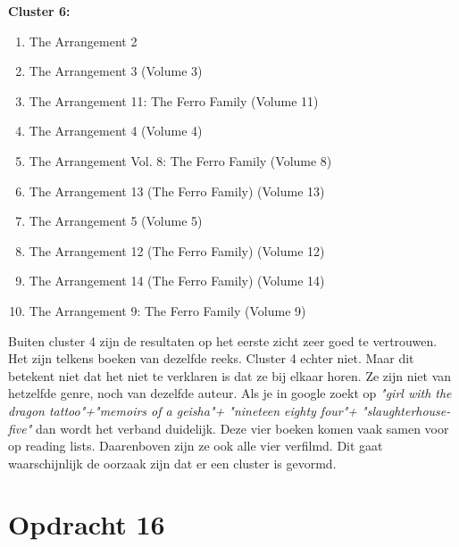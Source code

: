\documentclass[11pt,a4paper]{article}
\begin{document}
\textbf{Cluster 6:}
\begin{enumerate}
\item The Arrangement 2
\item The Arrangement 3 (Volume 3)
\item The Arrangement 11: The Ferro Family  (Volume 11)
\item The Arrangement 4 (Volume 4)
\item The Arrangement Vol. 8: The Ferro Family (Volume 8)
\item The Arrangement 13 (The Ferro Family) (Volume 13)
\item The Arrangement 5 (Volume 5)
\item The Arrangement 12 (The Ferro Family) (Volume 12)
\item The Arrangement 14 (The Ferro Family) (Volume 14)
\item The Arrangement 9: The Ferro Family (Volume 9)
\end{enumerate}
Buiten cluster 4 zijn de resultaten op het eerste zicht zeer goed te vertrouwen. Het zijn telkens boeken van dezelfde reeks. 
Cluster 4 echter niet. Maar dit betekent niet dat het niet te verklaren is dat ze bij elkaar horen. 
Ze zijn niet van hetzelfde genre, noch van dezelfde auteur. Als je in google zoekt op \textit{"girl with the dragon tattoo"+"memoirs of a geisha"+ "nineteen eighty four"+ "slaughterhouse-five"} dan wordt het verband duidelijk. 
Deze vier boeken komen vaak samen voor op reading lists. Daarenboven zijn ze ook alle vier verfilmd.
Dit gaat waarschijnlijk de oorzaak zijn dat er een cluster is gevormd.



\section*{Opdracht 16}
\end{document}
